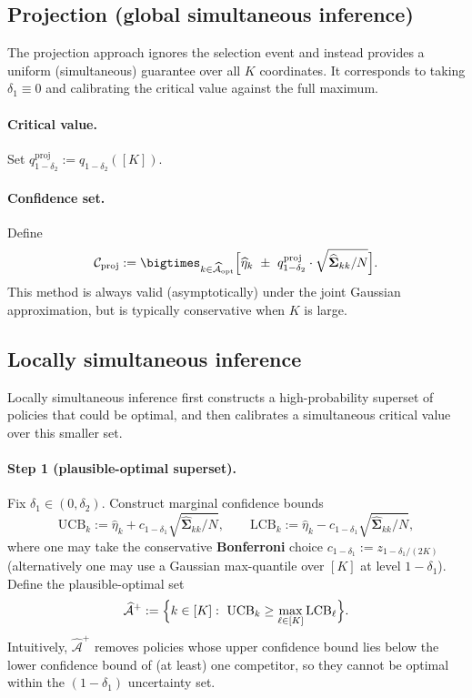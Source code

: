 \documentclass[12pt]{article}
\theoremstyle{remark}\newtheorem{remark}[theorem]{Remark}\theoremstyle{plain}
\begin{document}
\subsection{Projection (global simultaneous inference)}\label{subsec:proj}
The projection approach ignores the selection event and instead provides a uniform (simultaneous)
guarantee over all $K$ coordinates. It corresponds to taking $\delta_1 \equiv 0$ and calibrating the critical value
against the full maximum.

\paragraph{Critical value.}
Set $q^{\mathrm{proj}}_{1-\delta_2}:=q_{1-\delta_2}([K]).$

\paragraph{Confidence set.}
Define
\begin{equation*}\label{eq:CS_proj}
\mathcal{C}_{\mathrm{proj}}
:=
\bigtimes_{k\in\widehat{\mathcal{A}}_{\mathrm{opt}}}
\Bigl[
\widehat{\eta}_k \ \pm\ q^{\mathrm{proj}}_{1-\delta_2}\cdot \sqrt{\widehat{\boldsymbol{\Sigma}}_{kk}/N}
\Bigr].
\end{equation*}
This method is always valid (asymptotically) under the joint Gaussian approximation, but is typically
conservative when $K$ is large.

\subsection{Locally simultaneous inference}\label{subsec:localsim}
Locally simultaneous inference first constructs a high-probability superset of policies that could be
optimal, and then calibrates a simultaneous critical value over this smaller set.

\paragraph{Step 1 (plausible-optimal superset).}
Fix $\delta_1\in(0,\delta_2)$. Construct marginal confidence bounds
\[
\mathrm{UCB}_k:=\widehat{\eta}_k + c_{1-\delta_1}\sqrt{\widehat{\boldsymbol{\Sigma}}_{kk}/N},
\qquad
\mathrm{LCB}_k:=\widehat{\eta}_k - c_{1-\delta_1}\sqrt{\widehat{\boldsymbol{\Sigma}}_{kk}/N},
\]
where one may take the conservative \textbf{Bonferroni} choice
$c_{1-\delta_1}:=z_{1-\delta_1/(2K)}$ (alternatively one may use a Gaussian max-quantile over $[K]$ at level
$1-\delta_1$).
Define the plausible-optimal set
\begin{equation*}\label{eq:A_plus}
\widehat{\mathcal{A}}^{+}
:=
\Bigl\{k\in[K]:\ \mathrm{UCB}_k \ge \max_{\ell\in[K]}\mathrm{LCB}_\ell\Bigr\}.
\end{equation*}
Intuitively, $\widehat{\mathcal{A}}^{+}$ removes policies whose upper confidence bound lies below the
lower confidence bound of (at least) one competitor, so they cannot be optimal within the $(1-\delta_1)$
uncertainty set.
\end{document}
